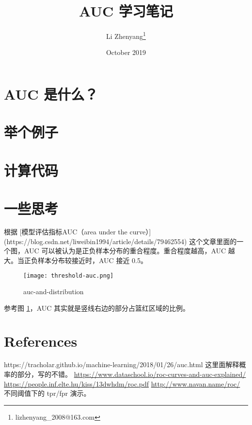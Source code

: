 \documentclass{article}
\title{AUC 学习笔记}
\author{Li Zhenyang\thanks{lizhenyang\_2008@163.com}}
\date{October 2019}
\begin{document}
   \maketitle
   \section{AUC 是什么？}
   \section{举个例子}
   \section{计算代码}
   \section{一些思考}
   根据 [模型评估指标AUC（area under the curve）](https://blog.csdn.net/liweibin1994/article/details/79462554) 这个文章里面的一个图，AUC 可以被认为是正负样本分布的重合程度。重合程度越高，AUC 越大。当正负样本分布较接近时，AUC 接近 0.5。
   \begin{figure}[h]
       \texttt{[image: threshold-auc.png]}
       \label{auc-and-distribution}
       \caption{auc-and-distribution}
   \end{figure}


   参考图 \ref{auc-and-distribution}，AUC 其实就是竖线右边的部分占篮红区域的比例。

    \section{References} 
     https://tracholar.github.io/machine-learning/2018/01/26/auc.html 这里面解释概率的部分，写的不错。
     \url{https://www.dataschool.io/roc-curves-and-auc-explained/}
     \url{https://people.inf.elte.hu/kiss/13dwhdm/roc.pdf}
     \url{http://www.navan.name/roc/} 不同阈值下的 tpr/fpr 演示。
\end{document}
